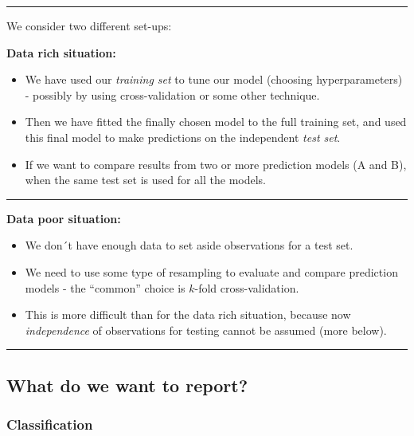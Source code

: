 \documentclass[
  letterpaper,
  DIV=11,
  numbers=noendperiod]{scrartcl}
\providecommand{\tightlist}{%
  \setlength{\itemsep}{0pt}\setlength{\parskip}{0pt}}\usepackage{longtable,booktabs,array}
\begin{document}
\begin{center}\rule{0.5\linewidth}{0.5pt}\end{center}

We consider two different set-ups:

\textbf{Data rich situation:}

\begin{itemize}
\tightlist
\item
  We have used our \emph{training set} to tune our model (choosing
  hyperparameters) - possibly by using cross-validation or some other
  technique.
\item
  Then we have fitted the finally chosen model to the full training set,
  and used this final model to make predictions on the independent
  \emph{test set}.
\item
  If we want to compare results from two or more prediction models (A
  and B), when the same test set is used for all the models.
\end{itemize}

\begin{center}\rule{0.5\linewidth}{0.5pt}\end{center}

\textbf{Data poor situation:}

\begin{itemize}
\tightlist
\item
  We don´t have enough data to set aside observations for a test set.
\item
  We need to use some type of resampling to evaluate and compare
  prediction models - the ``common'' choice is \(k\)-fold
  cross-validation.
\item
  This is more difficult than for the data rich situation, because now
  \emph{independence} of observations for testing cannot be assumed
  (more below).
\end{itemize}

\begin{center}\rule{0.5\linewidth}{0.5pt}\end{center}

\hypertarget{what-do-we-want-to-report}{%
\subsection{What do we want to
report?}\label{what-do-we-want-to-report}}

\hypertarget{classification}{%
\subsubsection{Classification}\label{classification}}
\end{document}
